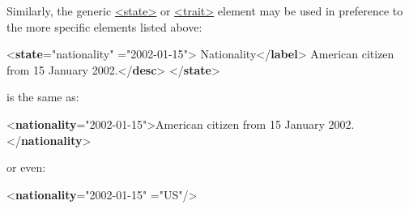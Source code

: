 Similarly, the generic \hyperref[TEI.state]{<state>} or \hyperref[TEI.trait]{<trait>} element may be used in preference to the more specific elements listed above: \par\bgroup{}\exampleFont \begin{shaded}\noindent\mbox{}{<\textbf{state}\hspace*{1em}{type}="{nationality}"\mbox{}\newline 
\hspace*{1em}{notBefore}="{2002-01-15}">}\mbox{}\newline 
{}Nationality{</\textbf{label}>}\mbox{}\newline 
{}American citizen from 15 January 2002.{</\textbf{desc}>}\mbox{}\newline 
{</\textbf{state}>}\end{shaded}\egroup\par \noindent  is the same as: \par\bgroup{}\exampleFont \begin{shaded}\noindent\mbox{}{<\textbf{nationality}\hspace*{1em}{notBefore}="{2002-01-15}">}American citizen from 15 January 2002.{</\textbf{nationality}>}\end{shaded}\egroup\par \noindent  or even: \par\bgroup{}\exampleFont \begin{shaded}\noindent\mbox{}{<\textbf{nationality}\hspace*{1em}{notBefore}="{2002-01-15}"\mbox{}\newline 
\hspace*{1em}{key}="{US}"/>}\end{shaded}\egroup\par 
